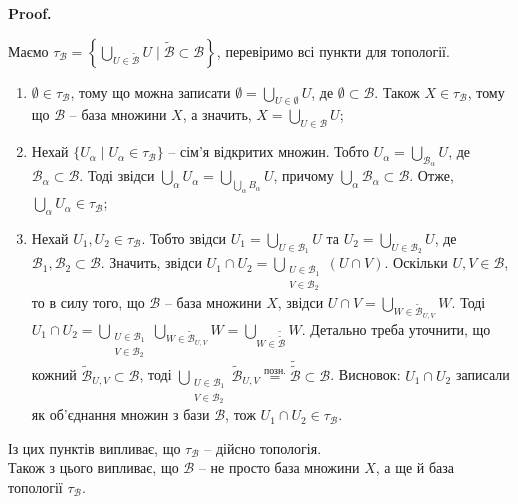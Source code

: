 \documentclass[a4paper, 10pt]{article}
\makeatletter
\theoremstyle{theoremdd}
\renewenvironment{proof}[1][Proof.\\]{\par
\pushQED{\hfill \qed}%
\normalfont \topsep6\p@\@plus6\p@\relax
\trivlist
\item\relax
{\bfseries
#1\@addpunct{.}}\hspace\labelsep\ignorespaces
}{%
\popQED\endtrivlist\@endpefalse
}
\makeatother
\begin{document}
\begin{proof}
Маємо $\tau_{\mathcal{B}} = \left\{ \displaystyle\bigcup_{U \in \mathcal{\mathcal{\tilde{B}}}} U \mid \mathcal{\tilde{B}} \subset \mathcal{B} \right\}$, перевіримо всі пункти для топології.
\begin{enumerate}[nosep,wide=0pt,label={\arabic*)}]
\item $\emptyset \in \tau_{\mathcal{B}}$, тому що можна записати $\emptyset = \displaystyle\bigcup_{U \in \emptyset} U$, де $\emptyset \subset \mathcal{B}$. Також $X \in \tau_{\mathcal{B}}$, тому що $\mathcal{B}$ -- база множини $X$, а значить, $X = \displaystyle\bigcup_{U \in \mathcal{B}} U$;
\item Нехай $\{U_\alpha \mid U_\alpha \in \tau_{\mathcal{B}}\}$ -- сім'я відкритих множин. Тобто $U_\alpha = \displaystyle\bigcup_{\mathcal{B}_\alpha} U$, де $\mathcal{B}_\alpha \subset \mathcal{B}$. Тоді звідси $\displaystyle\bigcup_\alpha U_\alpha = \bigcup_{\bigcup_\alpha B_\alpha} U$, причому $\displaystyle\bigcup_\alpha \mathcal{B}_\alpha \subset \mathcal{B}$. Отже, $\displaystyle\bigcup_\alpha U_\alpha \in \tau_\mathcal{B}$;
\item Нехай $U_1,U_2 \in \tau_\mathcal{B}$. Тобто звідси $U_1 = \displaystyle\bigcup_{U \in \mathcal{B}_1} U$ та $U_2 = \displaystyle\bigcup_{U \in \mathcal{B}_2} U$, де $\mathcal{B}_1,\mathcal{B}_2 \subset \mathcal{B}$. Значить, звідси $U_1 \cap U_2 = \displaystyle\bigcup_{\substack{U \in \mathcal{B}_1 \\ V \in \mathcal{B}_2}} (U \cap V)$. Оскільки $U,V \in \mathcal{B}$, то в силу того, що $\mathcal{B}$ -- база множини $X$, звідси $U \cap V = \displaystyle\bigcup_{W \in \mathcal{\tilde{B}}_{U,V}} W$. Тоді $U_1 \cap U_2 = \displaystyle\bigcup_{\substack{U \in \mathcal{B}_1 \\ V \in \mathcal{B}_2}} \bigcup_{W \in \mathcal{\tilde{B}}_{U,V}} W = \displaystyle\bigcup_{W \in \mathcal{\tilde{\tilde{B}}}} W$. Детально треба уточнити, що кожний $\mathcal{\tilde{B}}_{U,V} \subset \mathcal{B}$, тоді $\displaystyle\bigcup_{\substack{U \in \mathcal{B}_1 \\ V \in \mathcal{B}_2}} \mathcal{\tilde{B}}_{U,V} \overset{\text{позн.}}{=} \mathcal{\tilde{\tilde{B}}} \subset \mathcal{B}$. Висновок: $U_1 \cap U_2$ записали як об'єднання множин з бази $\mathcal{B}$, тож $U_1 \cap U_2 \in \tau_{\mathcal{B}}$.
\end{enumerate}
Із цих пунктів випливає, що $\tau_\mathcal{B}$ -- дійсно топологія.
\bigskip \\
Також з цього випливає, що $\mathcal{B}$ -- не просто база множини $X$, а ще й база топології $\tau_{\mathcal{B}}$.\\

\end{proof}
\end{document}
